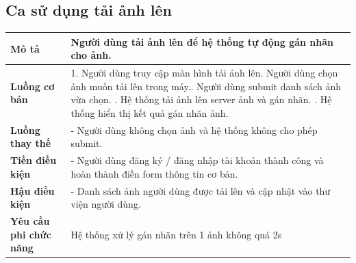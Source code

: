 \subsection{Ca sử dụng tải ảnh lên}

\vspace{0.5cm}

\noindent 
\begin{tabularx}{\linewidth}{| l | X |} 
\hline 
\textbf{Mô tả} & Người dùng tải ảnh lên để hệ thống tự động gán nhãn cho ảnh. \\
\hline 
\textbf{Luồng cơ bản} & 1. Người dùng truy cập màn hình tải ảnh lên\newline
                       2. Người dùng chọn ảnh muốn tải lên trong máy.\newline
                       3. Người dùng submit danh sách ảnh vừa chọn. \newline
                       4. Hệ thống tải ảnh lên server ảnh và gán nhãn. \newline
                       5. Hệ thống hiển thị kết quả gán nhãn ảnh. \\
\hline 
\textbf{Luồng thay thế} &
                       - Người dùng không chọn ảnh và hệ thống không cho phép submit. \\ 
\hline 
\textbf{Tiền điều kiện} & - Người dùng đăng ký / đăng nhập tài khoản thành công và hoàn thành điền form thông tin cơ bản. \\
\hline 
\textbf{Hậu điều kiện} & - Danh sách ảnh người dùng được tải lên và cập nhật vào thư viện người dùng. \\
\hline 
\textbf{Yêu cầu phi chức năng} & Hệ thống xử lý gán nhãn trên 1 ảnh không quá 2s \\
\hline 
\end{tabularx}

\vspace{0.8cm}

